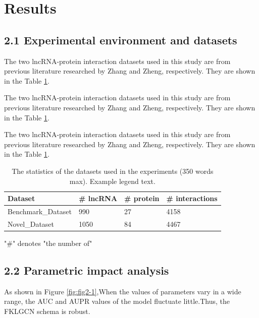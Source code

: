 \documentclass[fleqn,10pt]{wlscirep}
\begin{document}
\section*{Results}
\subsection*{2.1 Experimental environment and datasets}
The two lncRNA-protein interaction datasets used in this study are from previous literature researched by Zhang\cite{Zhang2018}  and Zheng\cite{Zheng2017a}, respectively. They are shown in the Table \ref{tab:datasets}.

The two lncRNA-protein interaction datasets used in this study are from previous literature researched by Zhang\cite{Zhang2018}  and Zheng\cite{Zheng2017a}, respectively. They are shown in the Table \ref{tab:datasets}.

The two lncRNA-protein interaction datasets used in this study are from previous literature researched by Zhang\cite{Zhang2018}  and Zheng\cite{Zheng2017a}, respectively. They are shown in the Table \ref{tab:datasets}.

\begin{table}[ht]
\centering
\caption{\label{tab:datasets} The statistics of the datasets used in the experiments (350 words max). Example legend text.}
\begin{threeparttable}[b]
\begin{tabular}{|l|l|l|l|}
\hline
Dataset & \# lncRNA & \# protein & \# interactions \\
\hline
Benchmark_Dataset & 990 & 27 & 4158\\
\hline
Novel_Dataset & 1050 & 84 & 4467 \\
\hline
\end{tabular}
\begin{tablenotes}
     \item "\#" denotes "the number of"
     \end{tablenotes}
     \end{threeparttable}
\end{table}

\subsection*{2.2 Parametric impact analysis}
As shown in Figure \ref{fig:fig2-1},When the values of parameters vary in a wide range, the AUC and AUPR values of the model fluctuate little.Thus, the FKLGCN schema is robust.
\end{document}
